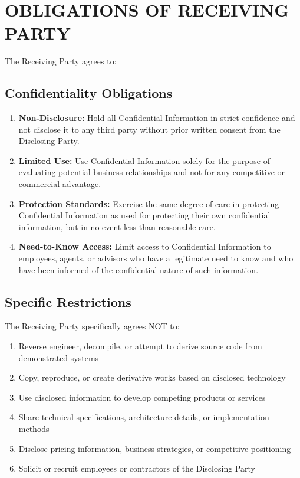 \documentclass[11pt,letterpaper]{article}
\begin{document}
\section{OBLIGATIONS OF RECEIVING PARTY}

The Receiving Party agrees to:

\subsection{Confidentiality Obligations}
\begin{enumerate}[leftmargin=0.5cm]
    \item \textbf{Non-Disclosure:} Hold all Confidential Information in strict confidence and not disclose it to any third party without prior written consent from the Disclosing Party.
    
    \item \textbf{Limited Use:} Use Confidential Information solely for the purpose of evaluating potential business relationships and not for any competitive or commercial advantage.
    
    \item \textbf{Protection Standards:} Exercise the same degree of care in protecting Confidential Information as used for protecting their own confidential information, but in no event less than reasonable care.
    
    \item \textbf{Need-to-Know Access:} Limit access to Confidential Information to employees, agents, or advisors who have a legitimate need to know and who have been informed of the confidential nature of such information.
\end{enumerate}

\subsection{Specific Restrictions}
The Receiving Party specifically agrees NOT to:

\begin{enumerate}[leftmargin=0.5cm]
    \item Reverse engineer, decompile, or attempt to derive source code from demonstrated systems
    \item Copy, reproduce, or create derivative works based on disclosed technology
    \item Use disclosed information to develop competing products or services
    \item Share technical specifications, architecture details, or implementation methods
    \item Disclose pricing information, business strategies, or competitive positioning
    \item Solicit or recruit employees or contractors of the Disclosing Party
\end{enumerate}
\end{document}
